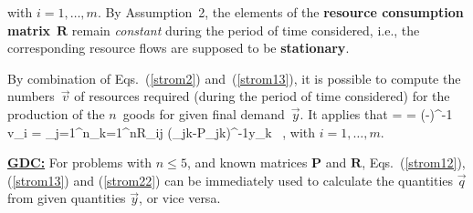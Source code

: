 %
\be
{}
\ee
%
with $i = 1, \ldots, m$. By Assumption~2, the elements of the {\bf 
resource consumption matrix}~$\mathbf{R}$ remain \emph{constant} 
during the period of time considered, i.e., the corresponding 
resource flows are supposed to be {\bf stationary}.

\medskip
\noindent
By combination of Eqs.~(\ref{strom2}) and~(\ref{strom13}), it is 
possible to compute the numbers~$\vec{v}$ of resources required 
(during the period of time considered) for the production of the 
$n$~goods for given final demand~$\vec{y}$. It applies that
%
\be
{}
 = 
= (-)^{-1}
\quad\Leftrightarrow\quad
v_{i} = \sum_{j=1}^{n}\sum_{k=1}^{n}R_{ij}
(\delta_{jk}-P_{jk})^{-1}y_{k} \ ,
\ee
%
with $i = 1, \ldots, m$.

\medskip
\noindent
\underline{\bf GDC:} For problems with $n \leq 5$, and known matrices $\mathbf{P}$ and $\mathbf{R}$, Eqs.~(\ref{strom12}), (\ref{strom13}) and (\ref{strom22}) can be immediately used to calculate the quantities $\vec{q}$ from given quantities $\vec{y}$, or vice versa.


